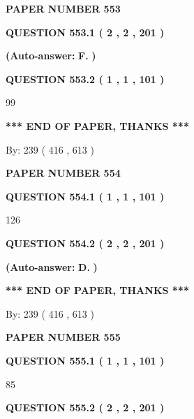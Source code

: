 \documentclass[12pt]{article}
\begin{document}
   
\newpage 
\setcounter{page}{ 
   553001 } 
   
   
 {\textbf{ \Large{ PAPER NUMBER  553  }}}
   
   
   
   
  
  
{\textbf{\large{QUESTION
553.1 
 ( 2 , 2 , 201 )
}}}
 
 
{\textbf{(Auto-answer:}}
{\textbf{\large{
F.}}}
{\textbf{)}}
 
 
  
  
{\textbf{\large{QUESTION
553.2 
 ( 1 , 1 , 101 )
}}}

99
   
   
   
   
\vspace{1.0in} 
{\textbf{\large{ *** END OF PAPER, THANKS *** }}} 
   
   
\hspace{1.0in} By: 
 239 ( 416 ,  613 )
   
   
   
   
\newpage 
\setcounter{page}{ 
   554001 } 
   
   
 {\textbf{ \Large{ PAPER NUMBER  554  }}}
   
   
   
   
  
  
{\textbf{\large{QUESTION
554.1 
 ( 1 , 1 , 101 )
}}}

126
  
  
{\textbf{\large{QUESTION
554.2 
 ( 2 , 2 , 201 )
}}}
 
 
{\textbf{(Auto-answer:}}
{\textbf{\large{
D.}}}
{\textbf{)}}
 
 
   
   
   
   
\vspace{1.0in} 
{\textbf{\large{ *** END OF PAPER, THANKS *** }}} 
   
   
\hspace{1.0in} By: 
 239 ( 416 ,  613 )
   
   
   
   
\newpage 
\setcounter{page}{ 
   555001 } 
   
   
 {\textbf{ \Large{ PAPER NUMBER  555  }}}
   
   
   
   
  
  
{\textbf{\large{QUESTION
555.1 
 ( 1 , 1 , 101 )
}}}

85
  
  
{\textbf{\large{QUESTION
555.2 
 ( 2 , 2 , 201 )
}}}
 
\end{document}
